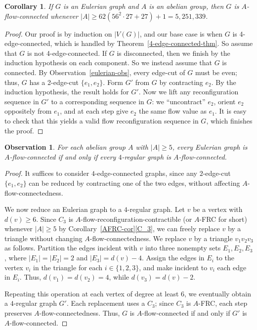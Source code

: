 \documentclass[a4paper,12pt]{article}
\theoremstyle{plain}
\newtheorem{cor}[theorem]{Corollary}
\newtheorem{obs}[theorem]{Observation}
\theoremstyle{definition}
\renewcommand\ge\geqslant
\begin{document}
\begin{cor}
	If $G$ is an Eulerian graph and $A$ is an abelian group, then $G$ is $A$-flow-connected whenever
	$|A|\ge 62(56^2\cdot 27+27)+1=5,251,339$.
\end{cor}
\begin{proof}
	Our proof is by induction on $|V(G)|$, and our base case is when $G$ is 4-edge-connected, which is
	handled by Theorem~\ref{4-edge-connected-thm}.  So assume that $G$ is not 4-edge-connected.
	If $G$ is disconnected, then we finish by the induction hypothesis on each component.  So we instead
	assume that $G$ is connected.  By Observation~\ref{eulerian-obs}, every edge-cut of $G$ must be
	even; thus, $G$ has a 2-edge-cut $\{e_1,e_2\}$.  Form $G'$ from $G$ by contracting $e_2$.
	By the induction hypothesis, the result holds for $G'$.  Now we lift any reconfiguration sequence
	in $G'$ to a corresponding sequence in $G$: we ``uncontract'' $e_2$, orient $e_2$ oppositely from
	$e_1$, and at each step give $e_2$ the same flow value as $e_1$.  It is easy to check that this yields
	a valid flow reconfiguration sequence in $G$, which finishes the proof.
\end{proof}

\begin{obs}
For each abelian group $A$ with $|A|\ge 5$, every Eulerian graph is $A$-flow-connected if and only if every $4$-regular graph is $A$-flow-connected.
\end{obs}

\begin{proof}
It suffices to consider $4$-edge-connected graphs, since any $2$-edge-cut $\{e_1,e_2\}$ can be reduced by contracting one of the two edges, without affecting $A$-flow-connectedness.

We now reduce an Eulerian graph to a $4$-regular graph. Let $v$ be a vertex with $d(v)\ge 6$. 
Since $C_3$ is $A$-flow-reconfiguration-contractible (or $A$-FRC for short) whenever $|A|\ge 5$ by Corollary~\ref{AFRC-cor}\ref{C_3}, we can freely replace $v$ by a triangle without changing $A$-flow-connectedness. We replace $v$ by a triangle $v_1v_2v_3$ as follows. Partition the edges incident with $v$ into three nonempty sets $E_1,E_2,E_3$, where $|E_1|=|E_2|=2$ and $|E_3|=d(v)-4$. Assign the edges in $E_i$ to the vertex $v_i$ in the triangle for each $i\in\{1,2,3\}$, and make incident to $v_i$ each edge in $E_i$. Thus, $d(v_1)=d(v_2)=4$, while $d(v_3)=d(v)-2$.

Repeating this operation at each vertex of degree at least $6$, we eventually obtain a $4$-regular graph $G'$. Each replacement uses a $C_3$; since $C_3$ is $A$-FRC, each step preserves $A$-flow-connectedness. Thus, $G$ is $A$-flow-connected if and only if $G'$ is $A$-flow-connected.
\end{proof}
\end{document}

